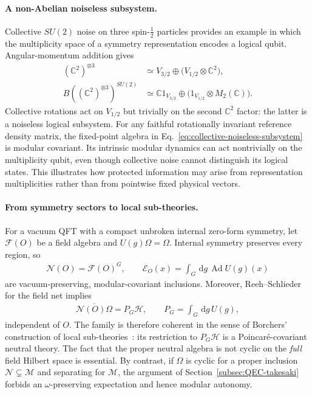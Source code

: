 \documentclass[a4paper,11pt]{article}
\theoremstyle{definition}
\newcommand{\dd}{\,\mathrm{d}}
\newcommand{\cH}{\mathcal{H}}
\newcommand{\mN}{\mathcal{N}}
\newcommand{\mM}{\mathcal{M}}
\newcommand{\mE}{\mathcal{E}}
\begin{document}
\paragraph{A non-Abelian noiseless subsystem.}
Collective $SU(2)$ noise on three spin-$\frac12$ particles provides an
example in which the multiplicity space of a symmetry representation
encodes a logical qubit. Angular-momentum addition gives
\begin{align}
 (\mathbb C^2)^{\otimes3}
 &\simeq V_{3/2}\oplus\bigl(V_{1/2}\otimes\mathbb C^2\bigr),\nonumber\\
 B((\mathbb C^2)^{\otimes3})^{SU(2)}
 &\simeq\mathbb C1_{V_{3/2}}\oplus
       \bigl(1_{V_{1/2}}\otimes M_2(\mathbb C)\bigr).
 \label{eq:collective-noiseless-subsystem}
\end{align}
Collective rotations act on $V_{1/2}$ but trivially on the second
$\mathbb C^2$ factor: the latter is a noiseless logical subsystem.
For any faithful rotationally invariant reference density matrix, the
fixed-point algebra in Eq.~\eqref{eq:collective-noiseless-subsystem}
is modular covariant. Its intrinsic modular dynamics can act
nontrivially on the multiplicity qubit, even though collective noise
cannot distinguish its logical states. This illustrates how protected
information may arise from representation multiplicities rather than
from pointwise fixed physical vectors.

\paragraph{From symmetry sectors to local sub-theories.}
For a vacuum QFT with a compact unbroken internal zero-form symmetry,
let $\mathcal F(O)$ be a field algebra and $U(g)\Omega=\Omega$. Internal
symmetry preserves every region, so
\begin{align}
 \mN(O)=\mathcal F(O)^G,\qquad
 \mE_O(x)=\int_G\dd g\,\operatorname{Ad}U(g)(x)
 \label{eq:internal-neutral-net}
\end{align}
are vacuum-preserving, modular-covariant inclusions. Moreover,
Reeh--Schlieder for the field net implies
\begin{align}
 \overline{\mN(O)\Omega}=P_G\cH,
 \qquad P_G=\int_G\dd g\,U(g),
 \label{eq:internal-coherent-projection}
\end{align}
independent of $O$. The family is therefore coherent in the sense of
Borchers' construction of local sub-theories~\cite{revolutionizing}:
its restriction to $P_G\cH$ is a Poincar\'e-covariant neutral theory.
The fact that the proper neutral algebra is not cyclic on the \emph{full}
field Hilbert space is essential. By contrast, if $\Omega$ is cyclic for
a proper inclusion $\mN\subsetneq\mM$ and separating for $\mM$, the
argument of Section~\ref{subsec:QEC-takesaki} forbids an
$\omega$-preserving expectation and hence modular autonomy.
\end{document}
